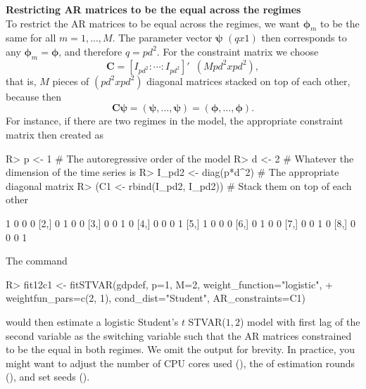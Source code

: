 \documentclass[nojss]{jss}
\begin{document}
\textbf{Restricting AR matrices to be the equal across the regimes}\\
To restrict the AR matrices to be equal across the regimes, we want $\boldsymbol{\phi}_m$ to be the same for all $m=1,...,M$. The parameter vector $\boldsymbol{\psi}$ $(qx1)$ then corresponds to any $\boldsymbol{\phi}_m=\boldsymbol{\phi}$, and therefore $q=pd^2$. For the constraint matrix we choose
\begin{equation}
\boldsymbol{C} = [I_{pd^2}:\cdots:I_{pd^2}]' \enspace (Mpd^2xpd^2),
\end{equation}
that is, $M$ pieces of $(pd^2xpd^2)$ diagonal matrices stacked on top of each other, because then
\begin{equation}
\boldsymbol{C}\boldsymbol{\psi}=(\boldsymbol{\psi},...,\boldsymbol{\psi})=(\boldsymbol{\phi},...,\boldsymbol{\phi}).
\end{equation}
For instance, if there are two regimes in the model, the appropriate constraint matrix then created as
%
\begin{CodeChunk}
\begin{CodeInput}
R> p <- 1 # The autoregressive order of the model
R> d <- 2 # Whatever the dimension of the time series is
R> I_pd2 <- diag(p*d^2) # The appropriate diagonal matrix
R> (C1 <- rbind(I_pd2, I_pd2)) # Stack them on top of each other
\end{CodeInput}
\begin{CodeOutput}
     [,1] [,2] [,3] [,4]
[1,]    1    0    0    0
[2,]    0    1    0    0
[3,]    0    0    1    0
[4,]    0    0    0    1
[5,]    1    0    0    0
[6,]    0    1    0    0
[7,]    0    0    1    0
[8,]    0    0    0    1
\end{CodeOutput}
\end{CodeChunk}
%
The command
\begin{CodeChunk}
\begin{CodeInput}
R> fit12c1 <- fitSTVAR(gdpdef, p=1, M=2, weight_function="logistic",
+    weightfun_pars=c(2, 1), cond_dist="Student", AR_constraints=C1)
\end{CodeInput}
\end{CodeChunk}
would then estimate a logistic Student's $t$ STVAR($1,2$) model with first lag of the second variable as the switching variable such that the AR matrices constrained to be the equal in both regimes. We omit the output for brevity. In practice, you might want to adjust the number of CPU cores used (), the of estimation rounds (), and set seeds ().
\end{document}
